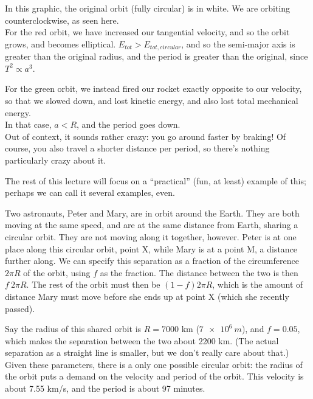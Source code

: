 In this graphic, the original orbit (fully circular) is in white. We are orbiting counterclockwise, as seen here.\\
For the red orbit, we have increased our tangential velocity, and so the orbit grows, and becomes elliptical. $E_{tot} > E_{tot,circular}$, and so the semi-major axis is greater than the original radius, and the period is greater than the original, since $T^2 \propto a^3$.

For the green orbit, we instead fired our rocket exactly opposite to our velocity, so that we slowed down, and lost kinetic energy, and also lost total mechanical energy.\\
In that case, $a < R$, and the period goes down.\\
Out of context, it sounds rather crazy: you go around faster by braking! Of course, you also travel a shorter distance per period, so there's nothing particularly crazy about it.

The rest of this lecture will focus on a ``practical'' (fun, at least) example of this; perhaps we can call it several examples, even.

Two astronauts, Peter and Mary, are in orbit around the Earth. They are both moving at the same speed, and are at the same distance from Earth, sharing a circular orbit. They are not moving along it together, however. Peter is at one place along this circular orbit, point X, while Mary is at a point M, a distance further along. We can specify this separation as a fraction of the circumference $2 \pi R$ of the orbit, using $f$ as the fraction. The distance between the two is then $f\ 2 \pi R$. The rest of the orbit must then be $(1-f) 2 \pi R$, which is the amount of distance Mary must move before she ends up at point X (which she recently passed).

\begin{figure}[H]
  \centering
{}
\end{figure}



Say the radius of this shared orbit is $R = 7000$ km ($\SI{7e6}{m}$), and $f = 0.05$, which makes the separation between the two about 2200 km. (The actual separation as a straight line is smaller, but we don't really care about that.)\\
Given these parameters, there is a only one possible circular orbit: the radius of the orbit puts a demand on the velocity and period of the orbit. This velocity is about 7.55 km/s, and the period is about 97 minutes.

